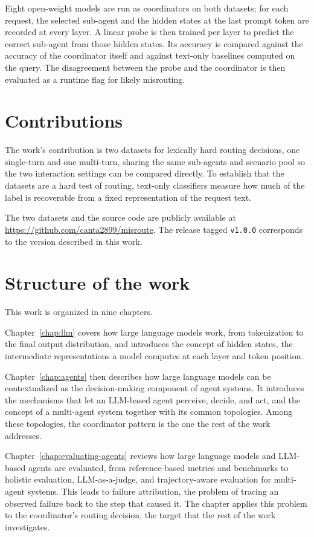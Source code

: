 Eight open-weight models are run as coordinators on both datasets; for each request, the selected sub-agent and the hidden states at the last prompt token are recorded at every layer. A linear probe is then trained per layer to predict the correct sub-agent from those hidden states. Its accuracy is compared against the accuracy of the coordinator itself and against text-only baselines computed on the query. The disagreement between the probe and the coordinator is then evaluated as a runtime flag for likely misrouting.

\section{Contributions}

The work's contribution is two datasets for lexically hard routing decisions, one single-turn and one multi-turn, sharing the same sub-agents and scenario pool so the two interaction settings can be compared directly. To establish that the datasets are a hard test of routing, text-only classifiers measure how much of the label is recoverable from a fixed representation of the request text.

The two datasets and the source code are publicly available at \url{https://github.com/canta2899/misroute}. The release tagged \texttt{v1.0.0} corresponds to the version described in this work.

\section{Structure of the work}

This work is organized in nine chapters.

Chapter~\ref{chap:llm} covers how large language models work, from tokenization to the final output distribution, and introduces the concept of hidden states, the intermediate representations a model computes at each layer and token position.

Chapter~\ref{chap:agents} then describes how large language models can be contextualized as the decision-making component of agent systems. It introduces the mechanisms that let an LLM-based agent perceive, decide, and act, and the concept of a multi-agent system together with its common topologies. Among these topologies, the coordinator pattern is the one the rest of the work addresses.

Chapter~\ref{chap:evaluating-agents} reviews how large language models and LLM-based agents are evaluated, from reference-based metrics and benchmarks to holistic evaluation, LLM-as-a-judge, and trajectory-aware evaluation for multi-agent systems. This leads to failure attribution, the problem of tracing an observed failure back to the step that caused it. The chapter applies this problem to the coordinator's routing decision, the target that the rest of the work investigates.

